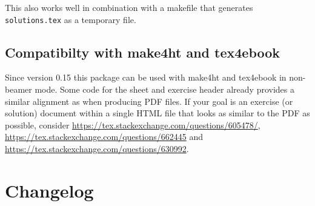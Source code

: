 \documentclass[DIV12,BCOR0mm]{scrartcl}
\newcommand{\vers}[1]{{\normalfont\ttfamily\color{black!90} #1}}
\begin{document}
This also works well in combination with a makefile that generates
\texttt{solutions.tex} as a temporary file.

\subsection{Compatibilty with make4ht and tex4ebook}
Since version \vers{0.15} this package can be used with make4ht and tex4ebook in non-beamer mode. Some code for the sheet and exercise header already provides a similar alignment as when producing PDF files. If your goal is an exercise (or solution) document within a single HTML file that looks as similar to the PDF as possible, consider \url{https://tex.stackexchange.com/questions/605478/}, \url{https://tex.stackexchange.com/questions/662445} and \url{https://tex.stackexchange.com/questions/630992}.

\section{Changelog}
\label{sec:changelog}
\end{document}

